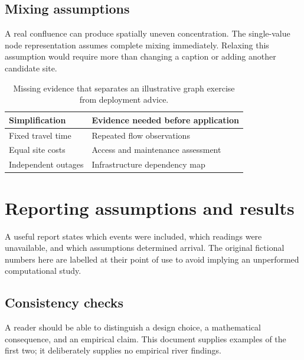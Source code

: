 \subsection{Mixing assumptions}\label{demo-interpretation-mixing}
A real confluence can produce spatially uneven concentration. The single-value node representation assumes complete mixing immediately. Relaxing this assumption would require more than changing a caption or adding another candidate site.
\begin{table}[htbp]
\centering
\begin{tabular}{ll}
\hline
Simplification & Evidence needed before application \\
\hline
Fixed travel time & Repeated flow observations \\
Equal site costs & Access and maintenance assessment \\
Independent outages & Infrastructure dependency map \\
\hline
\end{tabular}
\caption{Missing evidence that separates an illustrative graph exercise from deployment advice.}\label{demo-tab-limits}
\end{table}
\section{Reporting assumptions and results}\label{demo-interpretation-reporting}
A useful report states which events were included, which readings were unavailable, and which assumptions determined arrival. The original fictional numbers here are labelled at their point of use to avoid implying an unperformed computational study.
\subsection{Consistency checks}\label{demo-interpretation-checks}
A reader should be able to distinguish a design choice, a mathematical consequence, and an empirical claim. This document supplies examples of the first two; it deliberately supplies no empirical river findings.
